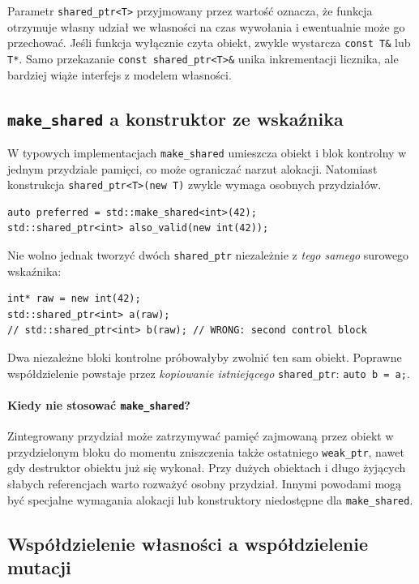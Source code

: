 Parametr \texttt{shared\_ptr<T>} przyjmowany przez wartość oznacza,
że funkcja otrzymuje własny udział we własności na czas wywołania
i ewentualnie może go przechować. Jeśli funkcja wyłącznie
czyta obiekt, zwykle wystarcza \texttt{const T\&} lub \texttt{T*}.
Samo przekazanie \texttt{const shared\_ptr<T>\&} unika inkrementacji
licznika, ale bardziej wiąże interfejs z modelem własności.

\subsection{\texttt{make\_shared} a konstruktor ze wskaźnika}

W typowych implementacjach \texttt{make\_shared} umieszcza obiekt
i blok kontrolny w jednym przydziale pamięci, co może ograniczać
narzut alokacji. Natomiast konstrukcja \texttt{shared\_ptr<T>(new T)}
zwykle wymaga osobnych przydziałów.

\begin{lstlisting}
auto preferred = std::make_shared<int>(42);
std::shared_ptr<int> also_valid(new int(42));
\end{lstlisting}

Nie wolno jednak tworzyć dwóch \texttt{shared\_ptr} niezależnie
z \emph{tego samego} surowego wskaźnika:

\begin{lstlisting}
int* raw = new int(42);
std::shared_ptr<int> a(raw);
// std::shared_ptr<int> b(raw); // WRONG: second control block
\end{lstlisting}

Dwa niezależne bloki kontrolne próbowałyby zwolnić ten sam obiekt.
Poprawne współdzielenie powstaje przez \emph{kopiowanie istniejącego}
\texttt{shared\_ptr}: \texttt{auto b = a;}.

\paragraph{Kiedy nie stosować \texttt{make\_shared}?}
Zintegrowany przydział może zatrzymywać pamięć zajmowaną przez
obiekt w przydzielonym bloku do momentu zniszczenia także ostatniego
\texttt{weak\_ptr}, nawet gdy destruktor obiektu już się wykonał.
Przy dużych obiektach i długo żyjących słabych referencjach
warto rozważyć osobny przydział. Innymi powodami mogą być
specjalne wymagania alokacji lub konstruktory niedostępne
dla \texttt{make\_shared}.

\subsection{Współdzielenie własności a współdzielenie mutacji}

